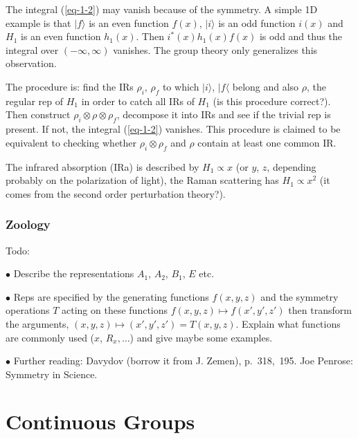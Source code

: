 The integral (\ref{eq-1-2}) may vanish because of the symmetry. A simple 1D
example is that $|f\rangle$ is an even function $f(x)$, $|i\rangle$ is an odd
function $i(x)$ and $H_1$ is an even function $h_1(x)$. Then
$i^*(x)h_1(x)f(x)$ is odd and thus the integral over $(-\infty,\infty)$
vanishes. The group theory only generalizes this observation.

The procedure is: find the IRs $\rho_i$, $\rho_f$ to which $|i\rangle$,
$|f\langle$ belong and also $\rho$, the regular rep of $H_1$ in order to catch
all IRs of $H_1$ (is this procedure correct?). Then construct
$\rho_i\otimes\rho\otimes\rho_f$, decompose it into IRs and see if the trivial
rep is present. If not, the integral (\ref{eq-1-2}) vanishes. This procedure
is claimed to be equivalent to checking whether $\rho_i\otimes \rho_f$ and
$\rho$ contain at least one common IR. 

The infrared absorption (IRa) is described by $H_1\propto x$ (or $y$, $z$,
depending probably on the polarization of light), the Raman scattering has
$H_1\propto x^2$ (it comes from the second order perturbation theory?).


\subsection{Zoology}

Todo:

\item{$\bullet$} Describe the representations $A_1$, $A_2$, $B_1$, $E$ etc. 

\item{$\bullet$} Reps are specified
by the generating functions $f(x,y,z)$ 
and the symmetry operations $T$ acting on these functions $f(x,y,z)\mapsto
f(x',y',z')$  then transform the arguments, $(x,y,z)\mapsto
(x',y',z')=T(x,y,z)$. Explain what functions are commonly used ($x$,
$R_x,\ldots$) and give maybe some examples.

\item{$\bullet$} Further reading: Davydov (borrow it from J. Zemen),
  p.~318,~195. Joe Penrose: Symmetry in Science.









\chapter{Continuous Groups}


